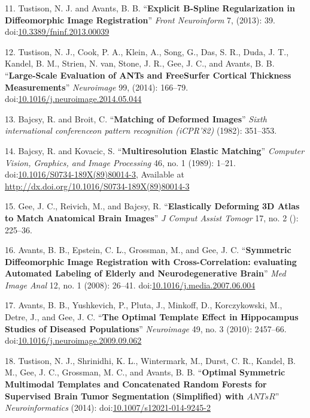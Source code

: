 \documentclass[11pt,]{article}
\begin{document}
11. Tustison, N. J. and Avants, B. B. ``\textbf{Explicit B-Spline
Regularization in Diffeomorphic Image Registration}'' \emph{Front
Neuroinform} 7, (2013): 39.
doi:\href{http://dx.doi.org/10.3389/fninf.2013.00039}{10.3389/fninf.2013.00039}

12. Tustison, N. J., Cook, P. A., Klein, A., Song, G., Das, S. R., Duda,
J. T., Kandel, B. M., Strien, N. van, Stone, J. R., Gee, J. C., and
Avants, B. B. ``\textbf{Large-Scale Evaluation of ANTs and FreeSurfer
Cortical Thickness Measurements}'' \emph{Neuroimage} 99, (2014):
166--79.
doi:\href{http://dx.doi.org/10.1016/j.neuroimage.2014.05.044}{10.1016/j.neuroimage.2014.05.044}

13. Bajcsy, R. and Broit, C. ``\textbf{Matching of Deformed Images}''
\emph{Sixth international conferenceon pattern recognition (iCPR'82)}
(1982): 351--353.

14. Bajcsy, R. and Kovacic, S. ``\textbf{Multiresolution Elastic
Matching}'' \emph{Computer Vision, Graphics, and Image Processing} 46,
no. 1 (1989): 1--21.
doi:\href{http://dx.doi.org/10.1016/S0734-189X(89)80014-3}{10.1016/S0734-189X(89)80014-3},
Available at \url{http://dx.doi.org/10.1016/S0734-189X(89)80014-3}

15. Gee, J. C., Reivich, M., and Bajcsy, R. ``\textbf{Elastically
Deforming 3D Atlas to Match Anatomical Brain Images}'' \emph{J Comput
Assist Tomogr} 17, no. 2 (): 225--36.

16. Avants, B. B., Epstein, C. L., Grossman, M., and Gee, J. C.
``\textbf{Symmetric Diffeomorphic Image Registration with
Cross-Correlation: evaluating Automated Labeling of Elderly and
Neurodegenerative Brain}'' \emph{Med Image Anal} 12, no. 1 (2008):
26--41.
doi:\href{http://dx.doi.org/10.1016/j.media.2007.06.004}{10.1016/j.media.2007.06.004}

17. Avants, B. B., Yushkevich, P., Pluta, J., Minkoff, D., Korczykowski,
M., Detre, J., and Gee, J. C. ``\textbf{The Optimal Template Effect in
Hippocampus Studies of Diseased Populations}'' \emph{Neuroimage} 49, no.
3 (2010): 2457--66.
doi:\href{http://dx.doi.org/10.1016/j.neuroimage.2009.09.062}{10.1016/j.neuroimage.2009.09.062}

18. Tustison, N. J., Shrinidhi, K. L., Wintermark, M., Durst, C. R.,
Kandel, B. M., Gee, J. C., Grossman, M. C., and Avants, B. B.
``\textbf{Optimal Symmetric Multimodal Templates and Concatenated Random
Forests for Supervised Brain Tumor Segmentation (Simplified) with
$ANTsR$}'' \emph{Neuroinformatics} (2014):
doi:\href{http://dx.doi.org/10.1007/s12021-014-9245-2}{10.1007/s12021-014-9245-2}
\end{document}
